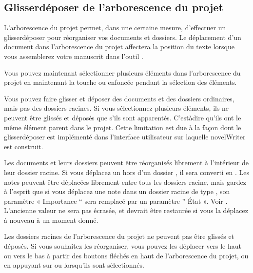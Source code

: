 \documentclass[a4paper,11pt,french]{sphinxmanual}
\begin{document}
\subsection{Glisser\sphinxhyphen{}déposer de l’arborescence du projet}
\label{\detokenize{usage_project:project-tree-drag-drop}}\label{\detokenize{usage_project:a-ui-tree-dnd}}
\sphinxAtStartPar
L’arborescence du projet permet, dans une certaine mesure, d’effectuer un glisser\sphinxhyphen{}déposer pour réorganiser vos documents et dossiers. Le déplacement d’un document dans l’arborescence du projet affectera la position du texte lorsque vous assemblerez votre manuscrit dans l’outil .

\sphinxAtStartPar
{}Vous pouvez maintenant sélectionner plusieurs éléments dans l’arborescence du projet en maintenant la touche  ou  enfoncée pendant la sélection des éléments.

\sphinxAtStartPar
Vous pouvez faire glisser et déposer des documents et des dossiers ordinaires, mais pas des dossiers racines. Si vous sélectionnez plusieurs éléments, ils ne peuvent être glissés et déposés que s’ils sont apparentés. C’est\sphinxhyphen{}à\sphinxhyphen{}dire qu’ils ont le même élément parent dans le projet. Cette limitation est due à la façon dont le glisser\sphinxhyphen{}déposer est implémenté dans l’interface utilisateur sur laquelle novelWriter est construit.

\sphinxAtStartPar
Les documents et leurs dossiers peuvent être réorganisés librement à l’intérieur de leur dossier racine. Si vous déplacez un  hors d’un dossier , il sera converti en . Les notes peuvent être déplacées librement entre tous les dossiers racine, mais gardez à l’esprit que si vous déplacez une note dans un dossier racine de type , son paramètre « Importance “ sera remplacé par un paramètre ” État ». Voir {\hyperref[\detokenize{usage_project:a-ui-tree-status}]{}}. L’ancienne valeur ne sera pas écrasée, et devrait être restaurée si vous la déplacez à nouveau à un moment donné.

\sphinxAtStartPar
Les dossiers racines de l’arborescence du projet ne peuvent pas être glissés et déposés. Si vous souhaitez les réorganiser, vous pouvez les déplacer vers le haut ou vers le bas à partir des boutons fléchés en haut de l’arborescence du projet, ou en appuyant sur  ou  lorsqu’ils sont sélectionnés.
\end{document}
